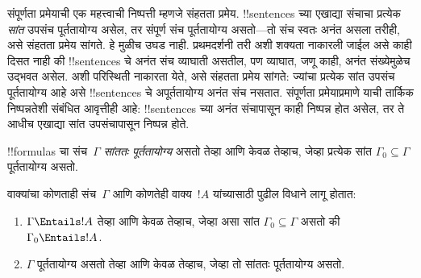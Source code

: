 \documentclass[../../../include/open-logic-section]{subfiles}
\begin{document}
      {}
      {}


संपूर्णता प्रमेयाची एक महत्त्वाची निष्पत्ती म्हणजे संहतता प्रमेय.
!!{sentence}s च्या एखाद्या संचाचा प्रत्येक \emph{सांत} उपसंच पूर्ततायोग्य असेल,
तर संपूर्ण संच पूर्ततायोग्य असतो---तो संच स्वतः अनंत असला तरीही, असे
संहतता प्रमेय सांगते. हे मुळीच उघड नाही. प्रथमदर्शनी तरी अशी शक्यता
नाकारली जाईल असे काही दिसत नाही की !!{sentence}s चे अनंत संच व्याघाती
असतील, पण व्याघात, जणू काही, अनंत संख्येमुळेच उद्भवत असेल. अशी परिस्थिती
नाकारता येते, असे संहतता प्रमेय सांगते: ज्यांचा प्रत्येक सांत उपसंच
पूर्ततायोग्य आहे असे !!{sentence}s चे अपूर्ततायोग्य अनंत संच नसतात.
संपूर्णता प्रमेयाप्रमाणे याची तार्किक निष्पन्नतेशी संबंधित आवृत्तीही आहे:
!!{sentence}s च्या अनंत संचापासून काही निष्पन्न होत असेल, तर ते आधीच
एखाद्या सांत उपसंचापासून निष्पन्न होते.

\begin{defn}
  !!{formula}s चा संच~$\Gamma$ \emph{सांततः पूर्ततायोग्य} असतो तेव्हा आणि
  केवळ तेव्हाच, जेव्हा प्रत्येक सांत $\Gamma_0 \subseteq \Gamma$
  पूर्ततायोग्य असतो.
\end{defn}

\begin{thm}[संहतता प्रमेय]
वाक्यांचा कोणताही संच~$\Gamma$ आणि कोणतेही वाक्य~$!A$ यांच्यासाठी पुढील
विधाने लागू होतात:
\begin{enumerate}
  \item $\Gamma \Entails !A$ तेव्हा आणि केवळ तेव्हाच, जेव्हा असा सांत
    $\Gamma_0 \subseteq \Gamma$ असतो की $\Gamma_0 \Entails !A$.
  \item $\Gamma$ पूर्ततायोग्य असतो तेव्हा आणि केवळ तेव्हाच, जेव्हा तो
    सांततः पूर्ततायोग्य असतो.
\end{enumerate}
\end{thm}
\end{document}
